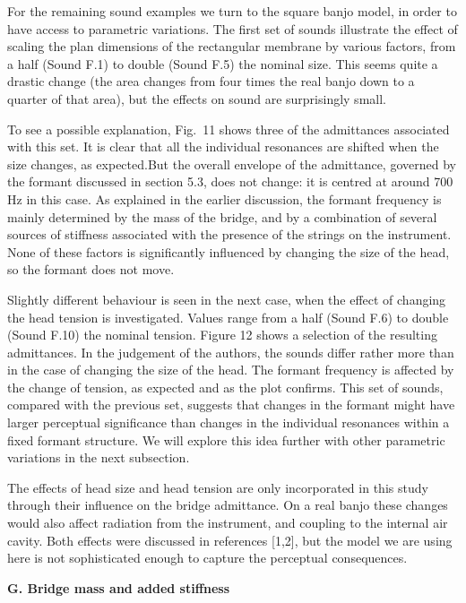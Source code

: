   For the remaining sound examples we turn to the square banjo model, in order 
  to have access to parametric variations. The first set of sounds illustrate 
  the effect of scaling the plan dimensions of the rectangular membrane by 
  various factors, from a half (Sound F.1) to double (Sound F.5) the nominal 
  size. This seems quite a drastic change (the area changes from four times the 
  real banjo down to a quarter of that area), but the effects on sound are 
  surprisingly small. 

  To see a possible explanation, Fig.\ 11 shows three of the admittances 
  associated with this set. It is clear that all the individual resonances are 
  shifted when the size changes, as expected.But the overall envelope of the 
  admittance, governed by the formant discussed in section 5.3, does not 
  change: it is centred at around 700 Hz in this case. As explained in the 
  earlier discussion, the formant frequency is mainly determined by the mass of 
  the bridge, and by a combination of several sources of stiffness associated 
  with the presence of the strings on the instrument. None of these factors is 
  significantly influenced by changing the size of the head, so the formant 
  does not move. 

  Slightly different behaviour is seen in the next case, when the effect of 
  changing the head tension is investigated. Values range from a half (Sound 
  F.6) to double (Sound F.10) the nominal tension. Figure 12 shows a selection 
  of the resulting admittances. In the judgement of the authors, the sounds 
  differ rather more than in the case of changing the size of the head. The 
  formant frequency is affected by the change of tension, as expected and as 
  the plot confirms. This set of sounds, compared with the previous set, 
  suggests that changes in the formant might have larger perceptual 
  significance than changes in the individual resonances within a fixed formant 
  structure. We will explore this idea further with other parametric variations 
  in the next subsection. 

  The effects of head size and head tension are only incorporated in this study 
  through their influence on the bridge admittance. On a real banjo these 
  changes would also affect radiation from the instrument, and coupling to the 
  internal air cavity. Both effects were discussed in references [1,2], but the 
  model we are using here is not sophisticated enough to capture the perceptual 
  consequences. 

  \textbf{G. Bridge mass and added stiffness} 

